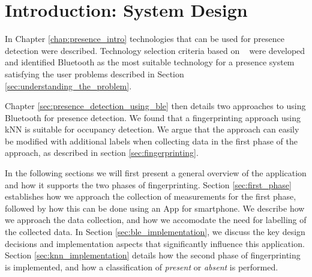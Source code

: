 \section{Introduction: System Design}
In Chapter \ref{chap:presence_intro} technologies that can be used for presence detection were described. 
Technology selection criteria based on \citeauthor{presence_ble_review}~\cite{presence_ble_review} were developed and identified Bluetooth as the most suitable technology for a presence system satisfying the user problems described in Section \ref{sec:understanding_the_problem}.

Chapter \ref{sec:presence_detection_using_ble} then details two approaches to using Bluetooth for presence detection. 
We found that a fingerprinting approach using kNN is suitable for occupancy detection. 
We argue that the approach can easily be modified with additional labels when collecting data in the first phase of the approach, as described in section \ref{sec:fingerprinting}.

In the following sections we will first present a general overview of the application and how it supports the two phases of fingerprinting. 
Section \ref{sec:first_phase} establishes how we approach the collection of measurements for the first phase, followed by how this can be done using an App for smartphone. 
We describe how we approach the data collection, and how we accomodate the need for labelling of the collected data.
In Section \ref{sec:ble_implementation}, we discuss the key design decisions and implementation aspects that significantly influence this application.
Section \ref{sec:knn_implementation} details how the second phase of fingerprinting is implemented, and how a classification of \textit{present} or \textit{absent} is performed.



